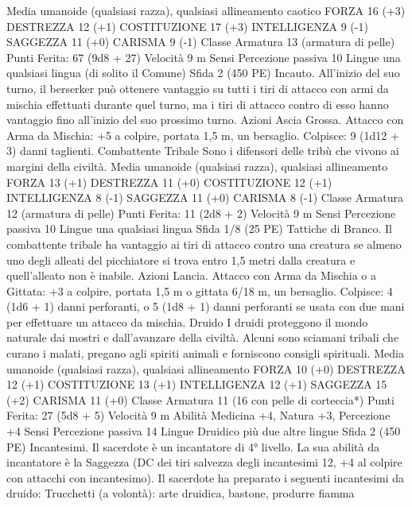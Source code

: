 \begin{multicols}{2}
Media umanoide (qualsiasi razza), qualsiasi allineamento
caotico
FORZA 16 (+3)
DESTREZZA 12 (+1)
COSTITUZIONE 17 (+3)
INTELLIGENZA 9 (-1)
SAGGEZZA 11 (+0)
CARISMA 9 (-1)
Classe Armatura 13 (armatura di pelle)
\hspace*{0pt}\hfill{Punti Ferita}: 67 (9d8 + 27)
Velocità 9 m
Sensi Percezione passiva 10
Lingue una qualsiasi lingua (di solito il Comune)
Sfida 2 (450 PE)
Incauto. All’inizio del suo turno, il berserker può ottenere
vantaggio su tutti i tiri di attacco con armi da mischia effettuati
durante quel turno, ma i tiri di attacco contro di esso hanno
vantaggio fino all’inizio del suo prossimo turno.
Azioni
Ascia Grossa. Attacco con Arma da Mischia: +5 a colpire,
portata 1,5 m, un bersaglio.
Colpisce: 9 (1d12 + 3) danni taglienti.
Combattente Tribale
Sono i difensori delle tribù che vivono ai margini della
civiltà.
Media umanoide (qualsiasi razza), qualsiasi allineamento
FORZA 13 (+1)
DESTREZZA 11 (+0)
COSTITUZIONE 12 (+1)
INTELLIGENZA 8 (-1)
SAGGEZZA 11 (+0)
CARISMA 8 (-1)
Classe Armatura 12 (armatura di pelle)
\hspace*{0pt}\hfill{Punti Ferita}: 11 (2d8 + 2)
Velocità 9 m
Sensi Percezione passiva 10
Lingue una qualsiasi lingua
Sfida 1/8 (25 PE)
Tattiche di Branco. Il combattente tribale ha vantaggio ai tiri di
attacco contro una creatura se almeno uno degli alleati del
picchiatore si trova entro 1,5 metri dalla creatura e quell’alleato
non è inabile.
Azioni
Lancia. Attacco con Arma da Mischia o a Gittata: +3 a colpire,
portata 1,5 m o gittata 6/18 m, un bersaglio.
Colpisce: 4 (1d6 + 1) danni perforanti, o 5 (1d8 + 1) danni
perforanti se usata con due mani per effettuare un attacco da
mischia.
Druido
I druidi proteggono il mondo naturale dai mostri e
dall’avanzare della civiltà. Alcuni sono sciamani tribali
che curano i malati, pregano agli spiriti animali e
forniscono consigli spirituali.
Media umanoide (qualsiasi razza), qualsiasi allineamento
FORZA 10 (+0)
DESTREZZA 12 (+1)
COSTITUZIONE 13 (+1)
INTELLIGENZA 12 (+1)
SAGGEZZA 15 (+2)
CARISMA 11 (+0)
Classe Armatura 11 (16 con pelle di corteccia*)
\hspace*{0pt}\hfill{Punti Ferita}: 27 (5d8 + 5)
Velocità 9 m
Abilità Medicina +4, Natura +3, Percezione +4
Sensi Percezione passiva 14
Lingue Druidico più due altre lingue
Sfida 2 (450 PE)
Incantesimi. Il sacerdote è un incantatore di 4° livello. La sua
abilità da incantatore è la Saggezza (DC dei tiri salvezza degli
incantesimi 12, +4 al colpire con attacchi con incantesimo). Il
sacerdote ha preparato i seguenti incantesimi da druido:
Trucchetti (a volontà): arte druidica, bastone, produrre fiamma

\end{multicols}
